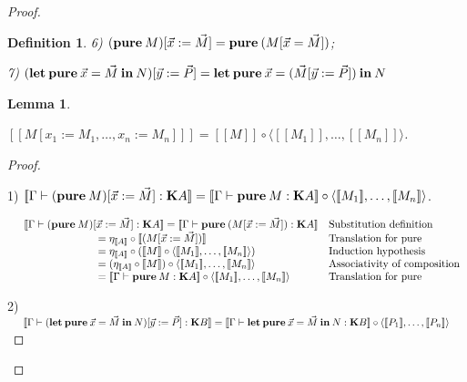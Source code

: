 \documentclass[a4paper]{article}
\newtheorem{lemma}{Lemma}
\newtheorem{defin}{Definition}
\begin{document}
\begin{proof}
\begin{defin}
6) $({\bf pure \:} M) [ \vec{x} := \vec{M}] = {\bf pure \:} (M [ \vec{x} = \vec{M}])$;

7) $({\bf let \: pure} \: \vec{x} = \vec{M} {\: \bf in \:} N) [\vec{y} := \vec{P}] =
{\bf let \: pure} \: \vec{x} = (\vec{M} [\vec{y} := \vec{P}]) {\: \bf in \:} N$

\end{defin}

\begin{lemma}
$ $

$[\![M [x_1 := M_1,\dots, x_n := M_n]]\!] = [\![M]\!] \circ \langle [\![M_1]\!], \dots, [\![M_n]\!] \rangle$.

\end{lemma}

\begin{proof}

$ $

1) $[\![\Gamma \vdash ({\bf pure \:} M) [ \vec{x} := \vec{M}] : {\bf K}A ]\!] = [\![ \Gamma \vdash {\bf pure \:} M : {\bf K}A]\!] \circ \langle [\![M_1]\!], \dots,
[\![M_n]\!] \rangle$.

\vspace{\baselineskip}

$\begin{array}{lll}
& [\![\Gamma \vdash ({\bf pure \:} M) [ \vec{x} := \vec{M}] : {\bf K}A]\!] = [\![ \Gamma \vdash {\bf pure \:} (M [ \vec{x} := \vec{M}]) : {\bf K}A]\!] &
\text{Substitution definition} \\
& \quad\quad\quad\quad\quad\quad\quad = \eta_{[\![A]\!]} \circ [\![(M [ \vec{x} := \vec{M}])]\!]&
\text{Translation for pure}\\
& \quad\quad\quad\quad\quad\quad\quad = \eta_{[\![A]\!]} \circ ([\![M]\!] \circ \langle [\![M_1]\!], \dots,
[\![M_n]\!] \rangle) & \text{Induction hypothesis} \\
& \quad\quad\quad\quad\quad\quad\quad = (\eta_{[\![A]\!]} \circ [\![M]\!]) \circ \langle [\![M_1]\!], \dots,
[\![M_n]\!] \rangle & \text{Associativity of composition}\\
& \quad\quad\quad\quad\quad\quad\quad = [\![ \Gamma \vdash {\bf pure \:} M : {\bf K}A]\!] \circ \langle [\![M_1]\!], \dots,
[\![M_n]\!] \rangle& \text{Translation for pure}\\
\end{array}$

\vspace{\baselineskip}

2) $\begin{array}{lll}&[\![\Gamma \vdash ({\bf let \: pure} \: \vec{x} = \vec{M} {\: \bf in \:} N) [\vec{y} := \vec{P}] : {\bf K} B]\!]
=[\![\Gamma \vdash {\bf let \: pure} \: \vec{x} = \vec{M} {\: \bf in \:} N : {\bf K}B]\!] \circ \langle [\![P_1]\!],\dots,[\![P_n]\!]\rangle& \end{array}$


\end{proof}
\end{proof}
\end{document}
